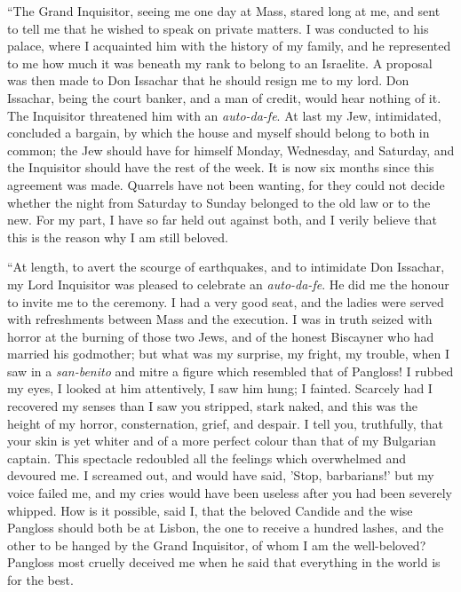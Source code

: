 ``The Grand Inquisitor, seeing me one day at Mass, stared long at me, and sent to tell me that he wished to speak on private matters. I was conducted to his palace, where I acquainted him with the history of my family, and he represented to me how much it was beneath my rank to belong to an Israelite. A proposal was then made to Don Issachar that he should resign me to my lord. Don Issachar, being the court banker, and a man of credit, would hear nothing of it. The Inquisitor threatened him with an \textit{auto-da-fe}. At last my Jew, intimidated, concluded a bargain, by which the house and myself should belong to both in common; the Jew should have for himself Monday, Wednesday, and Saturday, and the Inquisitor should have the rest of the week. It is now six months since this agreement was made. Quarrels have not been wanting, for they could not decide whether the night from Saturday to Sunday belonged to the old law or to the new. For my part, I have so far held out against both, and I verily believe that this is the reason why I am still beloved.

``At length, to avert the scourge of earthquakes, and to intimidate Don Issachar, my Lord Inquisitor was pleased to celebrate an \textit{auto-da-fe}. He did me the honour to invite me to the ceremony. I had a very good seat, and the ladies were served with refreshments between Mass and the execution. I was in truth seized with horror at the burning of those two Jews, and of the honest Biscayner who had married his godmother; but what was my surprise, my fright, my trouble, when I saw in a \textit{san-benito} and mitre a figure which resembled that of Pangloss! I rubbed my eyes, I looked at him attentively, I saw him hung; I fainted. Scarcely had I recovered my senses than I saw you stripped, stark naked, and this was the height of my horror, consternation, grief, and despair. I tell you, truthfully, that your skin is yet whiter and of a more perfect colour than that of my Bulgarian captain. This spectacle redoubled all the feelings which overwhelmed and devoured me. I screamed out, and would have said, 'Stop, barbarians!' but my voice failed me, and my cries would have been useless after you had been severely whipped. How is it possible, said I, that the beloved Candide and the wise Pangloss should both be at Lisbon, the one to receive a hundred lashes, and the other to be hanged by the Grand Inquisitor, of whom I am the well-beloved? Pangloss most cruelly deceived me when he said that everything in the world is for the best.

